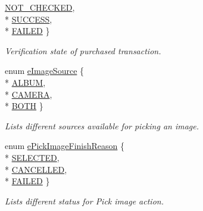 \begin{DoxyCompactItemize}
\hyperlink{namespace_voxel_busters_1_1_native_plugins_adebe7e13622c835cd0cd075be41b2003aef8fdced38856787318885d74120e588}{N\+O\+T\+\_\+\+C\+H\+E\+C\+K\+E\+D}, 
\\*
\hyperlink{namespace_voxel_busters_1_1_native_plugins_adebe7e13622c835cd0cd075be41b2003ad0749aaba8b833466dfcbb0428e4f89c}{S\+U\+C\+C\+E\+S\+S}, 
\\*
\hyperlink{namespace_voxel_busters_1_1_native_plugins_adebe7e13622c835cd0cd075be41b2003ab9e14d9b2886bcff408b85aefa780419}{F\+A\+I\+L\+E\+D}
 \}
\begin{DoxyCompactList}\small\item\em Verification state of purchased transaction. \end{DoxyCompactList}\item 
enum \hyperlink{namespace_voxel_busters_1_1_native_plugins_a7c22ee0fa98a425137dcfc6463ddfc2c}{e\+Image\+Source} \{ \\*
\hyperlink{namespace_voxel_busters_1_1_native_plugins_a7c22ee0fa98a425137dcfc6463ddfc2caeaa4b00b7c00e8fb9c185fdbb83b36a0}{A\+L\+B\+U\+M}, 
\\*
\hyperlink{namespace_voxel_busters_1_1_native_plugins_a7c22ee0fa98a425137dcfc6463ddfc2caddf0d6b21537d984fea6544f58101fa8}{C\+A\+M\+E\+R\+A}, 
\\*
\hyperlink{namespace_voxel_busters_1_1_native_plugins_a7c22ee0fa98a425137dcfc6463ddfc2ca6328e5e3186c227a021ef2ff77e40197}{B\+O\+T\+H}
 \}
\begin{DoxyCompactList}\small\item\em Lists different sources available for picking an image. \end{DoxyCompactList}\item 
enum \hyperlink{namespace_voxel_busters_1_1_native_plugins_a827272a4a290f79aec1c1634fcb15ab0}{e\+Pick\+Image\+Finish\+Reason} \{ \\*
\hyperlink{namespace_voxel_busters_1_1_native_plugins_a827272a4a290f79aec1c1634fcb15ab0ac841881b7f65d9e69aa9c932ca4427c8}{S\+E\+L\+E\+C\+T\+E\+D}, 
\\*
\hyperlink{namespace_voxel_busters_1_1_native_plugins_a827272a4a290f79aec1c1634fcb15ab0a9f935beb31030ad0d4d26126c0f39bf2}{C\+A\+N\+C\+E\+L\+L\+E\+D}, 
\\*
\hyperlink{namespace_voxel_busters_1_1_native_plugins_a827272a4a290f79aec1c1634fcb15ab0ab9e14d9b2886bcff408b85aefa780419}{F\+A\+I\+L\+E\+D}
 \}
\begin{DoxyCompactList}\small\item\em Lists different status for Pick image action. \end{DoxyCompactList}\item 

\end{DoxyCompactItemize}
